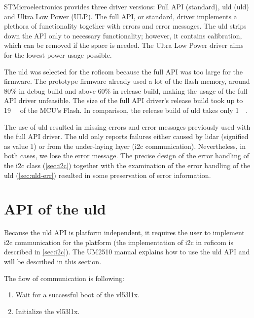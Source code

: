 \documentclass[
  digital,     %
  oneside,     %
  nosansbold,  %
  nocolorbold, %
  nolof,         %
  nolot,         %
]{fithesis4}
\begin{document}
{{{STMicroelectronics provides three driver versions: Full API (standard), \acrlong{uld} (\acrshort{uld}) and Ultra Low Power (ULP). The full API, or standard, driver implements a plethora of functionality together with errors and error messages. The \acrlong{uld} strips down the API only to necessary functionality; however, it contains calibration, which can be removed if the space is needed. The Ultra Low Power driver aims for the lowest power usage possible.

The \acrlong{uld} was selected for the \acrshort{roficom} because the full API was too large for the firmware. The prototype firmware already used a lot of the flash memory, around $80\%$ in debug build and above $60\%$ in release build, making the usage of the full API driver unfeasible. The size of the full API driver's release build took up to \qty{19}{\kilo\byte} of the MCU's Flash. In comparison, the release build of \acrlong{uld} takes only \qty{1}{\kilo\byte}. 

The use of \acrshort{uld} resulted in missing errors and error messages previously used with the full API driver. The \acrshort{uld} only reports failures either caused by lidar (signified as value $1$) or from the under-laying layer (\acrshort{i2c} communication). Nevertheless, in both cases, we lose the error message. The precise design of the error handling of the \acrshort{i2c} class (\autoref{sec:i2c}) together with the examination of the error handling of the \acrshort{uld} (\autoref{sec:uld-err}) resulted in some preservation of error information.

\section[ API of the Ultra Lite Driver ]{ API of the \acrlong{uld} } \label{sec:lidar-api}
Because the \acrshort{uld} API is platform independent, it requires the user to implement \acrshort{i2c} communication for the platform (the implementation of \acrshort{i2c} in \acrshort{roficom} is described in \autoref{sec:i2c}). The UM2510 \cite{um2510} manual explains how to use the \acrshort{uld} API and will be described in this section.

The flow of communication is following:
\begin{enumerate}
    \item Wait for a successful boot of the \gls{vl53l1x}.
    
    \item Initialize the \gls{vl53l1x}.
    

\end{enumerate}}}}
\end{document}

